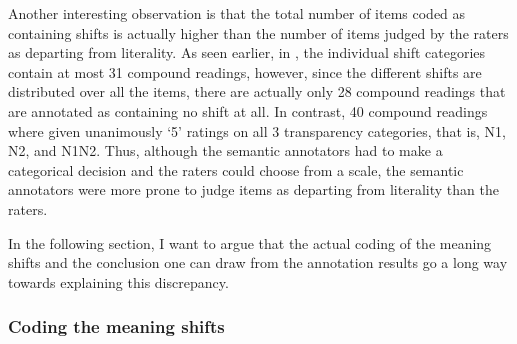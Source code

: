 Another interesting observation is that the total number of items
coded as containing shifts is actually higher than the number of items
judged by the raters as departing from literality. 
As
seen earlier, in , the
individual shift categories contain at most 31 compound readings,
however, since the different shifts are distributed over all the
items, there are actually only
28 compound readings that are annotated as containing no shift at all. In
contrast, 40 compound readings where given unanimously `5' ratings on
all 3 transparency categories, that is, N1, N2, and N1N2. Thus,
although the semantic annotators had to make a categorical decision and
the raters could choose from a scale, the semantic annotators were
more prone to judge items as departing from literality than the
raters.

In the following section, I want to argue that the actual coding of
the meaning shifts and the conclusion one can draw from the annotation
results go a long way towards explaining this discrepancy.

\subsubsection{Coding the meaning shifts}
\label{sec:bell&schaefer2013_shifts}


